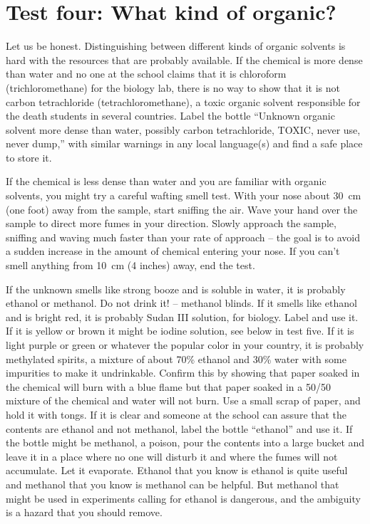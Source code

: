 \section{Test four: What kind of organic?}
\label{sec:testorganic}
Let us be honest. 
Distinguishing between different kinds of organic solvents 
is hard with the resources that are probably available. 
If the chemical is more dense than water 
and no one at the school claims that it is chloroform 
(trichloromethane) for the biology lab, 
there is no way to show that it is not carbon tetrachloride 
(tetrachloromethane), 
a toxic organic solvent responsible 
for the death students in several countries. 
Label the bottle ``Unknown organic solvent more dense than water, 
possibly carbon tetrachloride, 
TOXIC, 
never use, 
never dump,'' with similar warnings in any local language(s) 
and find a safe place to store it.

If the chemical is less dense than water 
and you are familiar with organic solvents, 
you might try a careful wafting smell test. 
With your nose about 30~cm (one foot) away from the sample, 
start sniffing the air. 
Wave your hand over the sample to direct more fumes in your direction. 
Slowly approach the sample, 
sniffing and waving much faster than your rate of approach -- 
the goal is to avoid a sudden increase in the amount of chemical 
entering your nose. 
If you can't smell anything from 10~cm (4 inches) away, 
end the test.

If the unknown smells like strong booze and is soluble in water, 
it is probably ethanol or methanol. 
Do not drink it! -- methanol blinds. 
If it smells like ethanol and is bright red, 
it is probably Sudan III solution, 
for biology. 
Label and use it. 
If it is yellow or brown it might be iodine solution, 
see below in test five. 
If it is light purple or green or whatever 
the popular color in your country, 
it is probably methylated spirits, 
a mixture of about 70\% ethanol and 30\% water
with some impurities to make it undrinkable. 
Confirm this by showing that paper soaked in the chemical 
will burn with a blue flame but that paper soaked in a 50/50 
mixture of the chemical and water will not burn. 
Use a small scrap of paper, and hold it with tongs. 
If it is clear and someone at the school can assure 
that the contents are ethanol and not methanol, 
label the bottle ``ethanol'' and use it. 
If the bottle might be methanol, 
a poison, 
pour the contents into a large bucket 
and leave it in a place where no one will disturb it 
and where the fumes will not accumulate. 
Let it evaporate. 
Ethanol that you know is ethanol is quite useful 
and methanol that you know is methanol can be helpful. 
But methanol that might be used in experiments calling for ethanol 
is dangerous, 
and the ambiguity is a hazard that you should remove.

